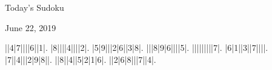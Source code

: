 \documentclass{article}
\begin{document}
\begin{center}
\Huge{Today's Sudoku}
\end{center}
\begin{center}
\Large{June 22, 2019}
\end{center}
\begin{sudoku}
||4|7||||6||1|.
|8||||4||||2|.
|5|9|||2|6||3|8|.
|||8|9|6||||5|.
|||||||||7|.
|6|1||3||7||||.
|7||4|||2|9|8||.
||8||4||5|2|1|6|.
||2|6|8|||7||4|.
\end{sudoku}
\end{document}
